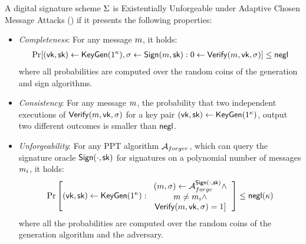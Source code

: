 \begin{definition}[EUFCMA]\label{def:eufcma}
    A digital signature scheme $\Sigma$ is Existentially Unforgeable under
    Adaptive Chosen Message Attacks (\eufcma) if it presents the following
    properties:

    \begin{itemize}
        \item \emph{Completeness}:
            For any message $m$, it holds:
            \begin{align}
                \Pr[(\mathsf{vk}, \mathsf{sk}) \leftarrow \mathsf{KeyGen}(1^\kappa), \sigma \leftarrow \mathsf{Sign}(m, \mathsf{sk}): 0 \leftarrow \mathsf{Verify}(m, \mathsf{vk}, \sigma)]
                \leq \mathsf{negl} \nonumber
            \end{align}
            where all probabilities are computed over the random coins of
            the generation and sign algorithms.
        \item \emph{Consistency}:
            For any message $m$, the probability that two independent
            executions of $\mathsf{Verify}(m, \mathsf{vk}, \sigma)$ for a key pair
            $(\mathsf{vk}, \mathsf{sk}) \leftarrow \mathsf{KeyGen}(1^\kappa)$,
            output two different outcomes is smaller than $\mathsf{negl}$.
        \item \emph{Unforgeability}:
            For any PPT algorithm $\mathcal{A}_{forger}$, which can query the
            signature oracle $\mathsf{Sign}(\cdot, \mathsf{sk})$ for signatures on a
            polynomial number of messages $m_i$, it holds:
            \begin{align}
                \Pr\left[
                (\keyverify, \keysign) \leftarrow \algokeygen(1^\secparam):
                \begin{tabular}{c}
                    $(\mesg, \signature) \leftarrow \adv_{forge}^{\algosign(\cdot, \keysign)} \wedge$ \\
                    $\mesg \neq \mesg_i \wedge$ \\
                    $\algover(\mesg, \keyverify, \signature) = 1]$ \\
                \end{tabular}
                \right]
                \leq \negl(\secparam) \nonumber
            \end{align}
            where all the probabilities are computed over the random coins of
            the generation algorithm and the adversary.
    \end{itemize}
\end{definition}

